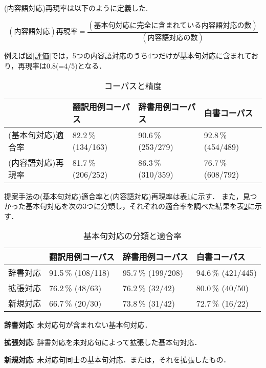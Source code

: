 (内容語対応)再現率は以下のように定義した.

\[
	(内容語対応)再現率 = \frac{(基本句対応に完全に含まれている内容語対応の数) }{ (内容語対応の数) }
\]

例えば図\ref{評価}では，5つの内容語対応のうち4つだけが基本句対応に含まれており，再現率は0.8(=4/5)となる．

\begin{table}
\begin{center}
\begin{tabular}{llll}
\hline
					&翻訳用例コーパス	& 辞書用例コーパス	&白書コーパス	\\
\hline                                   
(基本句対応)適合率	&	82.2\,\% (134/163)		& 90.6\,\% (253/279)	&	92.8\,\% (454/489)	\\
\hline                    
(内容語対応)再現率	&	81.7\,\% (206/252)		& 86.3\,\% (310/359)	&	76.7\,\% (608/792)	\\
\hline
\end{tabular}
\caption{コーパスと精度}
\label{tbコーパスと精度}
\end{center}
\end{table}

\vspace{3ex}

提案手法の(基本句対応)適合率と(内容語対応)再現率は表\ref{tbコーパスと精度}に示す．
また，見つかった基本句対応を次の3つに分類し，それぞれの適合率を調べた結果を表\ref{tb基本句対応の分類と適合率}に示す．


\begin{table}
\begin{center}
\begin{tabular}{llll}
\hline
				&	翻訳用例コーパス&	辞書用例コーパス	&白書コーパス	\\
\hline                                  
辞書対応			&	91.5\,\% (108/118)&	95.7\,\% (199/208)	&	94.6\,\% (421/445)	\\
拡張対応			&	76.2\,\% (48/63)	&	76.2\,\% (32/42)		&	80.0\,\% (40/50)	\\
新規対応			&	66.7\,\% (20/30)	&	73.8\,\% (31/42)		&	72.7\,\% (16/22)	\\
\hline

\end{tabular}
\caption{基本句対応の分類と適合率}
\label{tb基本句対応の分類と適合率}
\end{center}
\end{table}




\vspace{1ex}
\begin{description}
\item {\bf 辞書対応}: 未対応句が含まれない基本句対応．
\item {\bf 拡張対応}: 辞書対応を未対応句によって拡張した基本句対応．
\item {\bf 新規対応}: 未対応句同士の基本句対応．または，それを拡張したもの．
\end{description}
\vspace{1ex}


